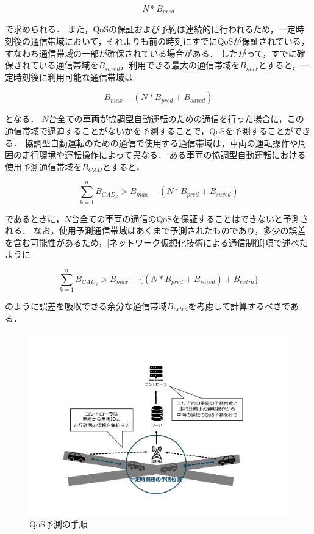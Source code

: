 \documentclass[a4paper,11pt,uplatex]{ujreport}
\begin{document}
\begin{equation}
N * B_{pred}
\end{equation}

で求められる．
また，QoSの保証および予約は連続的に行われるため，一定時刻後の通信帯域において，それよりも前の時刻にすでにQoSが保証されている，すなわち通信帯域の一部が確保されている場合がある．
したがって，すでに確保されている通信帯域を$B_{saved}$，利用できる最大の通信帯域を$B_{max}$とすると，一定時刻後に利用可能な通信帯域は

\begin{equation}
B_{max} - (N * B_{pred} + B_{saved})
\end{equation}

となる．
$N$台全ての車両が協調型自動運転のための通信を行った場合に，この通信帯域で逼迫することがないかを予測することで，QoSを予測することができる．
協調型自動運転のための通信で使用する通信帯域は，車両の運転操作や周囲の走行環境や運転操作によって異なる．
ある車両の協調型自動運転における使用予測通信帯域を$B_{CAD}$とすると，

\begin{equation}
\sum_{k=1}^{n} B_{CAD_k} > B_{max} - (N * B_{pred} + B_{saved})
\end{equation}

であるときに，$N$台全ての車両の通信のQoSを保証することはできないと予測される．
なお，使用予測通信帯域はあくまで予測されたものであり，多少の誤差を含む可能性があるため，\ref{ネットワーク仮想化技術による通信制御}項で述べたように

\begin{equation}
\sum_{k=1}^{n} B_{CAD_k} > B_{max} - \{(N * B_{pred} + B_{saved}) + B_{extra}\}
\end{equation}

のように誤差を吸収できる余分な通信帯域$B_{extra}$を考慮して計算するべきである．

\begin{figure}[tb]
  \centering
  \includegraphics[width=\linewidth]{img/QoS予測の手順.pdf}
  \caption{QoS予測の手順}
  \label{fig:QoSPrediction}
\end{figure}
\end{document}
